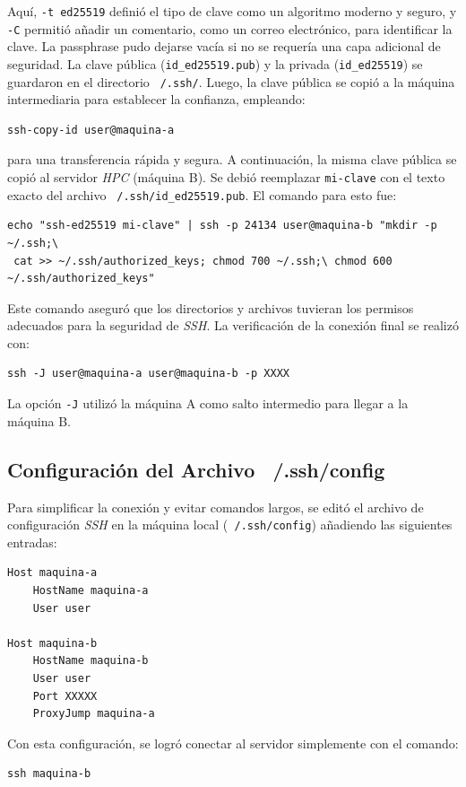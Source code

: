 Aquí, \texttt{-t ed25519} definió el tipo de clave como un algoritmo moderno y seguro, y \texttt{-C} permitió añadir un comentario, como un correo electrónico, para identificar la clave. La passphrase pudo dejarse vacía si no se requería una capa adicional de seguridad. La clave pública (\texttt{id\_ed25519.pub}) y la privada (\texttt{id\_ed25519}) se guardaron en el directorio \texttt{~/.ssh/}.
Luego, la clave pública se copió a la máquina intermediaria para establecer la confianza, empleando:
\begin{verbatim}
ssh-copy-id user@maquina-a
\end{verbatim}
para una transferencia rápida y segura. A continuación, la misma clave pública se copió al servidor \textit{HPC} (máquina B). Se debió reemplazar \texttt{mi-clave} con el texto exacto del archivo \texttt{~/.ssh/id\_ed25519.pub}. El comando para esto fue:
\begin{verbatim}
echo "ssh-ed25519 mi-clave" | ssh -p 24134 user@maquina-b "mkdir -p ~/.ssh;\
 cat >> ~/.ssh/authorized_keys; chmod 700 ~/.ssh;\ chmod 600 ~/.ssh/authorized_keys"
\end{verbatim}

Este comando aseguró que los directorios y archivos tuvieran los permisos adecuados para la seguridad de \textit{SSH}.
La verificación de la conexión final se realizó con:
\begin{verbatim}
ssh -J user@maquina-a user@maquina-b -p XXXX
\end{verbatim}

La opción \texttt{-J} utilizó la máquina A como salto intermedio para llegar a la máquina B.

\subsection*{Configuración del Archivo ~/.ssh/config}
Para simplificar la conexión y evitar comandos largos, se editó el archivo de configuración \textit{SSH} en la máquina local (\texttt{~/.ssh/config}) añadiendo las siguientes entradas:
\begin{verbatim}
Host maquina-a
    HostName maquina-a
    User user

Host maquina-b
    HostName maquina-b
    User user
    Port XXXXX
    ProxyJump maquina-a
\end{verbatim}
Con esta configuración, se logró conectar al servidor simplemente con el comando:
\begin{verbatim}
ssh maquina-b
\end{verbatim}

